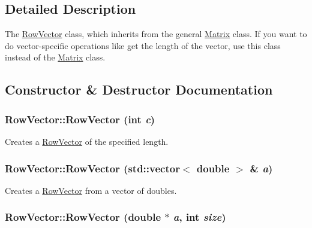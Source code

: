 \subsection{Detailed Description}
The \hyperlink{class_row_vector}{RowVector} class, which inherits from the general \hyperlink{class_matrix}{Matrix} class. If you want to do vector-\/specific operations like get the length of the vector, use this class instead of the \hyperlink{class_matrix}{Matrix} class. 

\subsection{Constructor \& Destructor Documentation}
\hypertarget{class_row_vector_a2f27ef01198c0c996290f5d6d1680297}{
\subsubsection[{RowVector}]{\setlength{\rightskip}{0pt plus 5cm}RowVector::RowVector (int {\em c})}}
\label{class_row_vector_a2f27ef01198c0c996290f5d6d1680297}


Creates a \hyperlink{class_row_vector}{RowVector} of the specified length. 

\hypertarget{class_row_vector_a6f0b27522b67138a7313c4a75750a7a6}{
\subsubsection[{RowVector}]{\setlength{\rightskip}{0pt plus 5cm}RowVector::RowVector (std::vector$<$ double $>$ \& {\em a})}}
\label{class_row_vector_a6f0b27522b67138a7313c4a75750a7a6}


Creates a \hyperlink{class_row_vector}{RowVector} from a vector of doubles. 

\hypertarget{class_row_vector_afdb9cc1d09c9dfaef6af93aec542f498}{
\subsubsection[{RowVector}]{\setlength{\rightskip}{0pt plus 5cm}RowVector::RowVector (double $\ast$ {\em a}, \/  int {\em size})}}
\label{class_row_vector_afdb9cc1d09c9dfaef6af93aec542f498}


